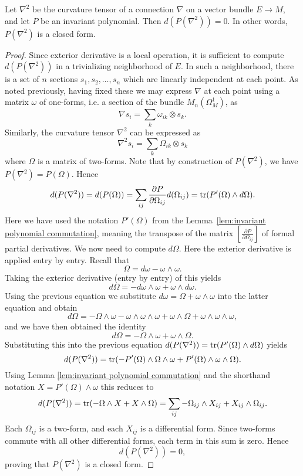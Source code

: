 \documentclass[a4paper,openany]{scrbook}
\begin{document}
\begin{prop}
\label{prop:p-curvature-closed}
Let $\nabla^2$ be the curvature tensor of a connection $\nabla$ on a vector bundle $E \to M$, and let $P$ be an invariant polynomial. Then $d(P(\nabla^2)) = 0$. In other words, $P(\nabla^2)$ is a closed form.
\begin{proof}
Since exterior derivative is a local operation, it is sufficient to compute $d(P(\nabla^2))$ in a trivializing neighborhood of $E$. In such a neighborhood, there is a set of $n$ sections $s_1, s_2, \ldots, s_n$ which are linearly independent at each point. As noted previously, having fixed these we may express $\nabla$ at each point using a matrix $\omega$ of one-forms, i.e. a section of the bundle $M_n(\Omega_M^1)$, as
\[\nabla s_i = \sum_k \omega_{ik} \otimes s_k.\]
Similarly, the curvature tensor $\nabla^2$ can be expressed as
\[\nabla^2 s_i = \sum_k \Omega_{ik} \otimes s_k\]
where $\Omega$ is a matrix of two-forms. Note that by construction of $P(\nabla^2)$, we have $P(\nabla^2) = P(\Omega)$. Hence
\[d(P(\nabla^2)) = d(P(\Omega)) = \sum_{ij} \frac{\partial P}{\partial \Omega_{ij}} d(\Omega_{ij}) = \operatorname{tr}(P'(\Omega) \wedge d\Omega).\]
Here we have used the notation $P'(\Omega)$ from the Lemma~\ref{lem:invariant polynomial commutation}, meaning the transpose of the matrix $[\frac{\partial P}{\partial \Omega_{ij}}]$ of formal partial derivatives. We now need to compute $d\Omega$. Here the exterior derivative is applied entry by entry. Recall that
\[\Omega = d\omega - \omega \wedge \omega.\]
Taking the exterior derivative (entry by entry) of this yields
\[d\Omega = -d\omega \wedge \omega + \omega \wedge d\omega.\]
Using the previous equation we substitute $d\omega = \Omega + \omega \wedge \omega$ into the latter equation and obtain
\[d\Omega = -\Omega \wedge \omega - \omega \wedge \omega \wedge \omega + \omega \wedge \Omega + \omega \wedge \omega \wedge \omega,\]
and we have then obtained the identity
\[d\Omega = -\Omega \wedge \omega + \omega \wedge \Omega.\]
Substituting this into the previous equation $d(P(\nabla^2)) = \operatorname{tr}(P'(\Omega) \wedge d\Omega)$ yields
\[d(P(\nabla^2)) = \operatorname{tr}(-P'(\Omega) \wedge \Omega \wedge \omega + P'(\Omega) \wedge \omega \wedge \Omega).\]
Using Lemma \ref{lem:invariant polynomial commutation} and the shorthand notation $X = P'(\Omega) \wedge \omega$ this reduces to
\[d(P(\nabla^2)) = \operatorname{tr}(-\Omega \wedge X + X \wedge \Omega) = \sum_{ij} -\Omega_{ij} \wedge X_{ij} + X_{ij} \wedge \Omega_{ij}.\]
Each $\Omega_{ij}$ is a two-form, and each $X_{ij}$ is a differential form. Since two-forms commute with all other differential forms, each term in this sum is zero. Hence
\[d(P(\nabla^2)) = 0,\]
proving that $P(\nabla^2)$ is a closed form.
\end{proof}
\end{prop}
\end{document}
